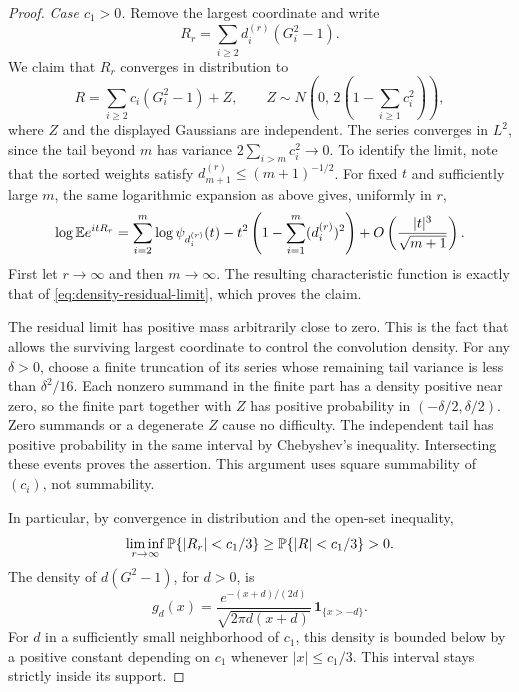\begin{proof}
\smallskip
\noindent\emph{Case $c_1>0$.}
Remove the largest coordinate and write
\[
 R_r=\sum_{i\ge2}d_i^{(r)}(G_i^2-1).
\]
We claim that $R_r$ converges in distribution to
\begin{equation}
\label{eq:density-residual-limit}
 R=\sum_{i\ge2}c_i(G_i^2-1)+Z,
 \qquad
 Z\sim N\left(0,\,2\left(1-\sum_{i\ge1}c_i^2\right)\right),
\end{equation}
where $Z$ and the displayed Gaussians are independent.
The series converges in $L^2$, since the tail beyond $m$ has variance
$2\sum_{i>m}c_i^2\to0$.  To identify the limit, note that the sorted weights
satisfy $d_{m+1}^{(r)}\le(m+1)^{-1/2}$.  For fixed $t$ and sufficiently
large $m$, the same logarithmic expansion as above gives, uniformly
in $r$,
\[
 \log\mathbb E e^{itR_r}
 =
 \sum_{i=2}^m\log\psi_{d_i^{(r)}}(t)
 -t^2\left(1-\sum_{i=1}^m(d_i^{(r)})^2\right)
 +O\left(\frac{|t|^3}{\sqrt{m+1}}\right).
\]
First let $r\to\infty$ and then $m\to\infty$.  The resulting
characteristic function is exactly that of \eqref{eq:density-residual-limit},
which proves the claim.

The residual limit has positive mass arbitrarily close to zero.
This is the fact that allows the surviving largest coordinate to
control the convolution density. For any $\delta>0$, choose a finite
truncation of its series
whose remaining tail variance is less than $\delta^2/16$.
Each nonzero summand in the finite part has a density positive near
zero, so the finite part together with $Z$ has positive probability
in $(-\delta/2,\delta/2)$.  Zero summands or a degenerate $Z$ cause
no difficulty.  The independent tail has positive probability in
the same interval by Chebyshev's inequality.  Intersecting these
events proves the assertion.  This argument uses square summability
of $(c_i)$, not summability.

In particular, by convergence in distribution and the open-set
inequality,
\[
 \liminf_{r\to\infty}\mathbb P\{|R_r|<c_1/3\}
 \ge\mathbb P\{|R|<c_1/3\}>0.
\]
The density of $d(G^2-1)$, for $d>0$, is
\[
 g_d(x)=
 \frac{e^{-(x+d)/(2d)}}{\sqrt{2\pi d(x+d)}}
 \,\mathbf1_{\{x>-d\}}.
\]
For $d$ in a sufficiently small neighborhood of $c_1$, this density
is bounded below by a positive constant depending on $c_1$ whenever
$|x|\le c_1/3$.  This interval stays strictly inside its support.


\end{proof}
